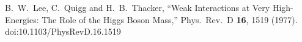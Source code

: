 \begin{thebibliography}{99}
  B.~W.~Lee, C.~Quigg and H.~B.~Thacker,
  ``Weak Interactions at Very High-Energies: The Role of the Higgs Boson Mass,''
  Phys.\ Rev.\ D {\bf 16}, 1519 (1977).
  doi:10.1103/PhysRevD.16.1519

\end{thebibliography}

